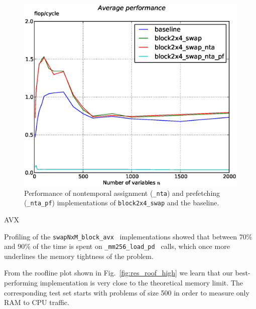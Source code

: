 \documentclass[letterpaper]{article}
\begin{document}
\begin{figure}\centering
  \includegraphics[scale=0.4]{img/results_cachecontrol_novec.eps}
  \caption{Performance of nontemporal assignment ({\tt \_nta}) and prefetching ({\tt \_nta\_pf}) implementations of {\tt block2x4\_swap} and the baseline.\label{fig:res_cachecontrol}}
\end{figure}

AVX

Profiling of the {\tt swapNxM\_block\_avx } implementations showed that between 70\% and 90\% of the time is spent on {\tt \_mm256\_load\_pd } calls,
which once more underlines the memory tightness of the problem.

From the roofline plot shown in Fig.~\ref{fig:res_roof_high} we learn that our best-performing implementation is very close to the theoretical memory limit.
The corresponding test set starts with problems of size 500 in order to measure only RAM to CPU traffic.
\end{document}
